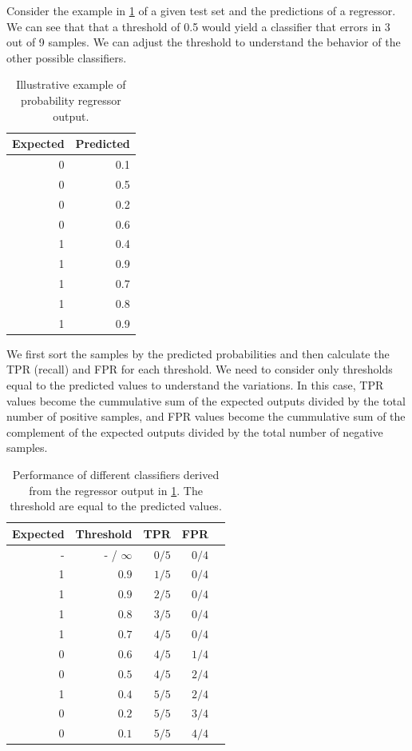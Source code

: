 Consider the example in \cref{tab:prob-reg-out} of a given test set and the predictions of
a regressor. We can see that that a threshold of 0.5 would yield a classifier that errors
in 3 out of 9 samples.  We can adjust the threshold to understand the behavior of the
other possible classifiers.

\begin{table}\caption{Illustrative example of probability regressor output.}\label{tab:prob-reg-out}
  \centering
  \begin{tabular}{rr}
    \toprule
    \textbf{Expected} & \textbf{Predicted} \\
    \midrule
    0 & 0.1  \\
    0 & 0.5  \\
    0 & 0.2  \\
    0 & 0.6  \\
    1 & 0.4  \\
    1 & 0.9  \\
    1 & 0.7  \\
    1 & 0.8  \\
    1 & 0.9  \\
    \bottomrule
  \end{tabular}
\end{table}

We first sort the samples by the predicted probabilities and then calculate the TPR
(recall) and FPR for each threshold.  We need to consider only thresholds equal to the
predicted values to understand the variations.  In this case, TPR values become the
cummulative sum of the expected outputs divided by the total number of positive samples,
and FPR values become the cummulative sum of the complement of the expected outputs
divided by the total number of negative samples.

\begin{table}
  \centering
  \begin{tabular}{rrrrr}
    \toprule
    \textbf{Expected} & \textbf{Threshold} & \textbf{TPR} & \textbf{FPR}  \\
    \midrule
    - & - / $\infty$ & $0/5$ & $0/4$ \\
    1 & $0.9$        & $1/5$ & $0/4$ \\
    1 & $0.9$        & $2/5$ & $0/4$ \\
    1 & $0.8$        & $3/5$ & $0/4$ \\
    1 & $0.7$        & $4/5$ & $0/4$ \\
    0 & $0.6$        & $4/5$ & $1/4$ \\
    0 & $0.5$        & $4/5$ & $2/4$ \\
    1 & $0.4$        & $5/5$ & $2/4$ \\
    0 & $0.2$        & $5/5$ & $3/4$ \\
    0 & $0.1$        & $5/5$ & $4/4$ \\
    \bottomrule
  \end{tabular}
  \caption{
  Performance of different classifiers derived from the regressor output in
  \cref{tab:prob-reg-out}.  The threshold are equal to the predicted values.
  }
  \label{tab:prob-reg-example}
\end{table}

